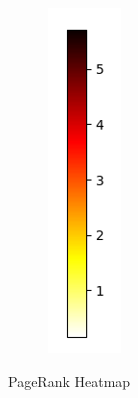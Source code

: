 \begin{figure}[H]
\begin{subfigure}{0.1\textwidth}
            \includegraphics[width=0.8\linewidth]{img/heatmap_bar.png}
            \label{fig:2}
          \end{subfigure}
          \caption{PageRank Heatmap}
          \label{fig:overall}
        \end{figure}

